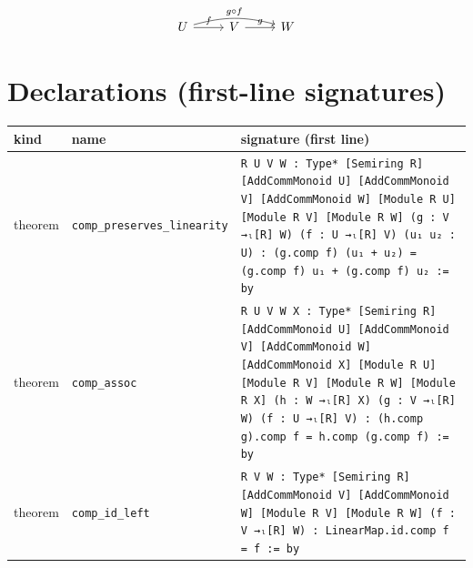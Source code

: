 \documentclass[12pt]{article}
\begin{document}
\[
\begin{tikzcd}
U \arrow[r, "f"] \arrow[rr, bend left=15, "{g \circ f}"] & V \arrow[r, "g"] & W
\end{tikzcd}
\]


\section*{Declarations (first-line signatures)} 
\begin{center}
\begin{tabular}{lll}
\textbf{kind} & \textbf{name} & \textbf{signature (first line)} \\ \hline
theorem & \texttt{comp\_preserves\_linearity} & \texttt{{R U V W : Type*} [Semiring R] [AddCommMonoid U] [AddCommMonoid V] [AddCommMonoid W] [Module R U] [Module R V] [Module R W] (g : V →ₗ[R] W) (f : U →ₗ[R] V) (u₁ u₂ : U) : (g.comp f) (u₁ + u₂) = (g.comp f) u₁ + (g.comp f) u₂ := by} \\
theorem & \texttt{comp\_assoc} & \texttt{{R U V W X : Type*} [Semiring R] [AddCommMonoid U] [AddCommMonoid V] [AddCommMonoid W] [AddCommMonoid X] [Module R U] [Module R V] [Module R W] [Module R X] (h : W →ₗ[R] X) (g : V →ₗ[R] W) (f : U →ₗ[R] V) : (h.comp g).comp f = h.comp (g.comp f) := by} \\
theorem & \texttt{comp\_id\_left} & \texttt{{R V W : Type*} [Semiring R] [AddCommMonoid V] [AddCommMonoid W] [Module R V] [Module R W] (f : V →ₗ[R] W) : LinearMap.id.comp f = f := by} \\
\end{tabular}
\end{center}
\end{document}
